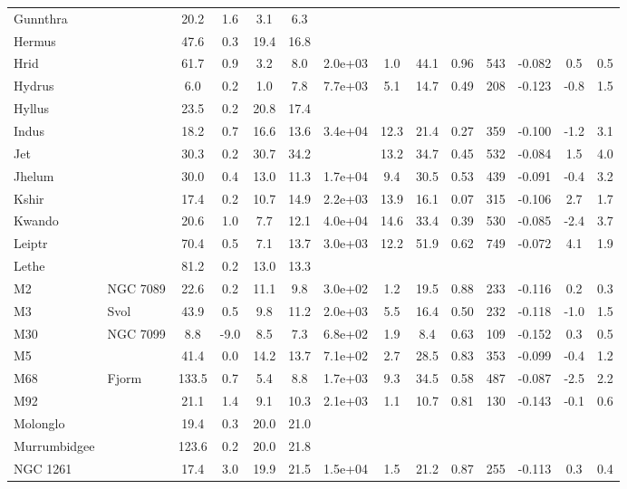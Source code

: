 \begin{tabular}{llSSSSSSSSrSSS}
Gunnthra &  & 20.2 & 1.6 & 3.1 & 6.3 &  &  &  &  &  &  &  &  \\
Hermus &  & 47.6 & 0.3 & 19.4 & 16.8 &  &  &  &  &  &  &  &  \\
Hrid &  & 61.7 & 0.9 & 3.2 & 8.0 & 2.0e+03 & 1.0 & 44.1 & 0.96 & 543 & -0.082 & 0.5 & 0.5 \\
Hydrus &  & 6.0 & 0.2 & 1.0 & 7.8 & 7.7e+03 & 5.1 & 14.7 & 0.49 & 208 & -0.123 & -0.8 & 1.5 \\
Hyllus &  & 23.5 & 0.2 & 20.8 & 17.4 &  &  &  &  &  &  &  &  \\
Indus &  & 18.2 & 0.7 & 16.6 & 13.6 & 3.4e+04 & 12.3 & 21.4 & 0.27 & 359 & -0.100 & -1.2 & 3.1 \\
Jet &  & 30.3 & 0.2 & 30.7 & 34.2 &  & 13.2 & 34.7 & 0.45 & 532 & -0.084 & 1.5 & 4.0 \\
Jhelum &  & 30.0 & 0.4 & 13.0 & 11.3 & 1.7e+04 & 9.4 & 30.5 & 0.53 & 439 & -0.091 & -0.4 & 3.2 \\
Kshir &  & 17.4 & 0.2 & 10.7 & 14.9 & 2.2e+03 & 13.9 & 16.1 & 0.07 & 315 & -0.106 & 2.7 & 1.7 \\
Kwando &  & 20.6 & 1.0 & 7.7 & 12.1 & 4.0e+04 & 14.6 & 33.4 & 0.39 & 530 & -0.085 & -2.4 & 3.7 \\
Leiptr &  & 70.4 & 0.5 & 7.1 & 13.7 & 3.0e+03 & 12.2 & 51.9 & 0.62 & 749 & -0.072 & 4.1 & 1.9 \\
Lethe &  & 81.2 & 0.2 & 13.0 & 13.3 &  &  &  &  &  &  &  &  \\
M2 & NGC 7089 & 22.6 & 0.2 & 11.1 & 9.8 & 3.0e+02 & 1.2 & 19.5 & 0.88 & 233 & -0.116 & 0.2 & 0.3 \\
M3 & Svol & 43.9 & 0.5 & 9.8 & 11.2 & 2.0e+03 & 5.5 & 16.4 & 0.50 & 232 & -0.118 & -1.0 & 1.5 \\
M30 & NGC 7099 & 8.8 & -9.0 & 8.5 & 7.3 & 6.8e+02 & 1.9 & 8.4 & 0.63 & 109 & -0.152 & 0.3 & 0.5 \\
M5 &  & 41.4 & 0.0 & 14.2 & 13.7 & 7.1e+02 & 2.7 & 28.5 & 0.83 & 353 & -0.099 & -0.4 & 1.2 \\
M68 & Fjorm & 133.5 & 0.7 & 5.4 & 8.8 & 1.7e+03 & 9.3 & 34.5 & 0.58 & 487 & -0.087 & -2.5 & 2.2 \\
M92 &  & 21.1 & 1.4 & 9.1 & 10.3 & 2.1e+03 & 1.1 & 10.7 & 0.81 & 130 & -0.143 & -0.1 & 0.6 \\
Molonglo &  & 19.4 & 0.3 & 20.0 & 21.0 &  &  &  &  &  &  &  &  \\
Murrumbidgee &  & 123.6 & 0.2 & 20.0 & 21.8 &  &  &  &  &  &  &  &  \\
NGC 1261 &  & 17.4 & 3.0 & 19.9 & 21.5 & 1.5e+04 & 1.5 & 21.2 & 0.87 & 255 & -0.113 & 0.3 & 0.4 \\

\end{tabular}

